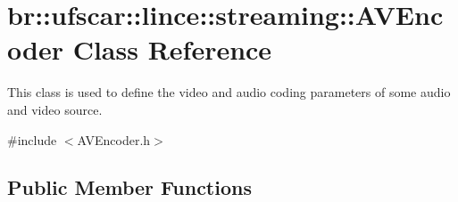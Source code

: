 \hypertarget{classbr_1_1ufscar_1_1lince_1_1streaming_1_1AVEncoder}{
\section{br::ufscar::lince::streaming::AVEncoder Class Reference}
\label{classbr_1_1ufscar_1_1lince_1_1streaming_1_1AVEncoder}
}


This class is used to define the video and audio coding parameters of some audio and video source.  




{\ttfamily \#include $<$AVEncoder.h$>$}

\subsection*{Public Member Functions}
